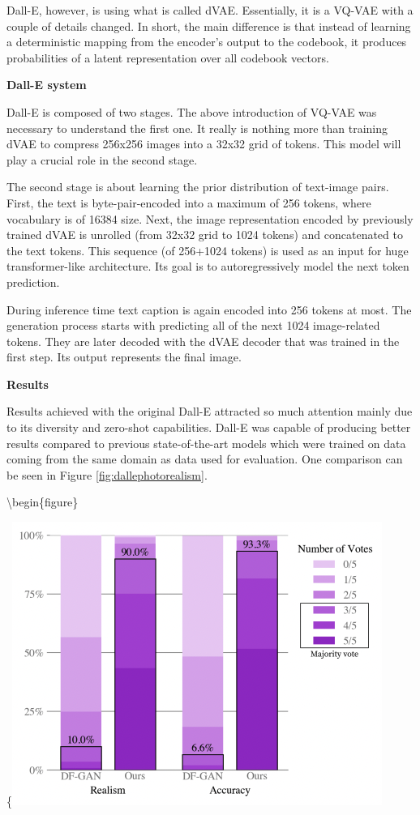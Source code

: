\documentclass[
]{krantz}
\begin{document}
Dall-E, however, is using what is called dVAE. Essentially, it is a VQ-VAE with a couple of details changed. In short, the main difference is that instead of learning a deterministic mapping from the encoder's output to the codebook, it produces probabilities of a latent representation over all codebook vectors.

\textbf{Dall-E system}

Dall-E is composed of two stages. The above introduction of VQ-VAE was necessary to understand the first one. It really is nothing more than training dVAE to compress 256x256 images into a 32x32 grid of tokens. This model will play a crucial role in the second stage.

The second stage is about learning the prior distribution of text-image pairs. First, the text is byte-pair-encoded \citep{BPE2015} into a maximum of 256 tokens, where vocabulary is of 16384 size. Next, the image representation encoded by previously trained dVAE is unrolled (from 32x32 grid to 1024 tokens) and concatenated to the text tokens. This sequence (of 256+1024 tokens) is used as an input for huge transformer-like architecture. Its goal is to autoregressively model the next token prediction.

During inference time text caption is again encoded into 256 tokens at most. The generation process starts with predicting all of the next 1024 image-related tokens. They are later decoded with the dVAE decoder that was trained in the first step. Its output represents the final image.

\textbf{Results}

Results achieved with the original Dall-E attracted so much attention mainly due to its diversity and zero-shot capabilities. Dall-E was capable of producing better results compared to previous state-of-the-art models which were trained on data coming from the same domain as data used for evaluation. One comparison can be seen in Figure \ref{fig:dallephotorealism}.

\textbackslash begin\{figure\}

\{\centering \includegraphics[width=0.8\linewidth]{figures/02-02-text-2-img/dallephotorealism}
\end{document}
